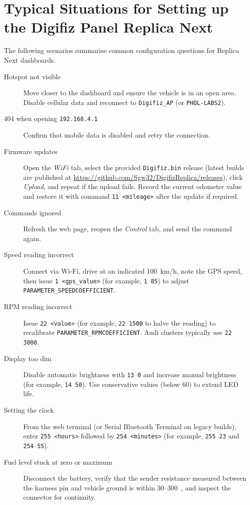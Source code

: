 \chapter{Typical Situations for Setting up the Digifiz Panel Replica Next} \label{ch:replica-next-scenarios}

The following scenarios summarise common configuration questions for Replica Next dashboards.

\begin{description}
    \item[Hotspot not visible] Move closer to the dashboard and ensure the vehicle is in an open area.
          Disable cellular data and reconnect to \texttt{Digifiz\_AP} (or \texttt{PHOL-LABS2}).
    \item[404 when opening \texttt{192.168.4.1}] Confirm that mobile data is disabled and retry the connection.
    \item[Firmware updates] Open the \emph{WiFi} tab, select the provided \texttt{Digifiz.bin} release (latest builds are published at \url{https://github.com/Sgw32/DigifizReplica/releases}), click \emph{Upload}, and repeat if the upload fails.
          Record the current odometer value and restore it with command \verb|11 <mileage>| after the update if required.
    \item[Commands ignored] Refresh the web page, reopen the \emph{Control} tab, and send the command again.
    \item[Speed reading incorrect] Connect via Wi-Fi, drive at an indicated 100~km/h, note the GPS speed, then issue \verb|1 <gps_value>| (for example, \verb|1 85|) to adjust \texttt{PARAMETER\_SPEEDCOEFFICIENT}.
    \item[RPM reading incorrect] Issue \verb|22 <value>| (for example, \verb|22 1500| to halve the reading) to recalibrate \texttt{PARAMETER\_RPMCOEFFICIENT}.
          Audi clusters typically use \verb|22 3000|.
    \item[Display too dim] Disable automatic brightness with \verb|13 0| and increase manual brightness (for example, \verb|14 50|).
          Use conservative values (below 60) to extend LED life.
    \item[Setting the clock] From the web terminal (or Serial Bluetooth Terminal on legacy builds), enter \verb|255 <hours>| followed by \verb|254 <minutes>| (for example, \verb|255 23| and \verb|254 55|).
    \item[Fuel level stuck at zero or maximum] Disconnect the battery, verify that the sender resistance measured between the harness pin and vehicle ground is within 30--300~\ohm{}, and inspect the connector for continuity.

\end{description}
